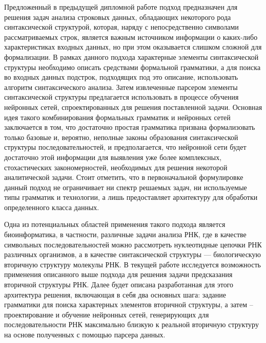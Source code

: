 Предложенный в предыдущей дипломной работе подход предназначен для решения задач анализа строковых данных, обладающих некоторого рода синтаксической структурой, которая, наряду с непосредственно символами рассматриваемых строк, является важным источником информации о каких-либо характеристиках входных данных, но при этом оказывается слишком сложной для формализации.
В рамках данного подхода характерные элементы синтаксической структуры необходимо описать средствами формальной грамматики, а для поиска во входных данных подстрок, подходящих под это описание, использовать алгоритм синтаксического анализа. Затем извлеченные парсером элементы синтаксической структуры предлагается использовать в процессе обучения нейронных сетей, спроектированных для решения поставленной задачи. Основная идея такого комбинирования формальных грамматик и нейронных сетей заключается в том, что достаточно простая грамматика призвана формализовать только базовые и, вероятно, неполные законы образования синтаксической структуры последовательностей, и предполагается, что нейронной сети будет достаточно этой информации для выявления уже более комплексных, стохастических закономерностей, необходимых для решения некоторой аналитической задачи. Стоит отметить, что в первоначальной формулировке данный подход не ограничивает ни спектр решаемых задач, ни используемые типы грамматик и технологии, а лишь предоставляет архитектуру для обработки определенного класса данных.

Одна из потенциальных областей применения такого подхода является биоинформатика, в частности, различные задачи анализа РНК, где в качестве символьных последовательностей можно рассмотреть нуклеотидные цепочки РНК различных организмов, а в качестве синтаксической структуры --- биологическую вторичную структуру молекулы РНК. В текущей работе исследуется возможность применения описанного выше подхода для решения задачи предсказания вторичной структуры РНК. Далее будет описана разработанная для этого архитектура решения, включающая в себя два основных шага: задание грамматики для поиска характерных элементов вторичной структуры, а затем -- проектирование и обучение нейронных сетей, генерирующих для последовательности РНК максимально близкую к реальной вторичную структуру на основе полученных с помощью парсера данных.

